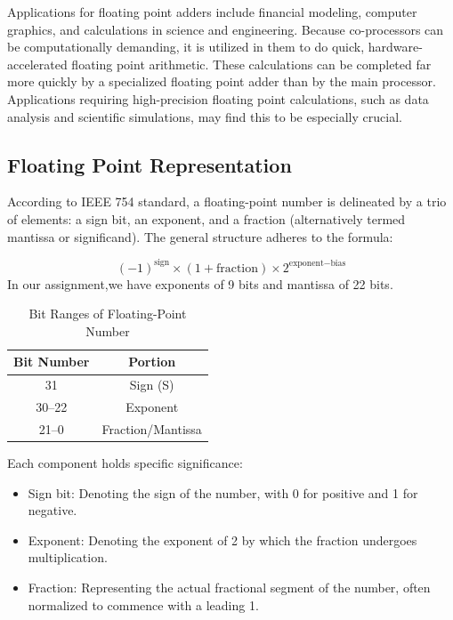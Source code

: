 \documentclass[a4paper,12pt]{article}
\begin{document}
Applications for floating point adders include financial modeling, computer
graphics, and calculations in science and engineering. Because co-processors
can be computationally demanding, it is utilized in them to do quick,
hardware-accelerated floating point arithmetic. These calculations can be
completed far more quickly by a specialized floating point adder than by the
main processor. Applications requiring high-precision floating point
calculations, such as data analysis and scientific simulations, may find this
to be especially crucial.

\subsection{Floating Point Representation}

According to IEEE 754 standard, a floating-point number is delineated by a trio
of elements: a sign bit, an exponent, and a fraction (alternatively termed
mantissa or significand). The general structure adheres to the formula:

\[
    (-1)^{\text{sign}} \times (1 + \text{fraction}) \times 2^{\text{exponent} - \text{bias}}
\]
In our assignment,we have exponents of 9 bits and mantissa of 22 bits.

\begin{table}[h]
    \centering
    \begin{tabular}{|c|c|}
        \hline
        Bit Number & Portion           \\
        \hline
        31         & Sign (S)          \\
        30--22     & Exponent          \\
        21--0      & Fraction/Mantissa \\
        \hline
    \end{tabular}
    \caption{Bit Ranges of Floating-Point Number}
    \label{tab:floating_point_bits}
\end{table}

Each component holds specific significance:

\begin{itemize}
    \item Sign bit: Denoting the sign of the number, with 0 for positive and 1 for
          negative.
    \item Exponent: Denoting the exponent of 2 by which the fraction undergoes
          multiplication.
    \item Fraction: Representing the actual fractional segment of the number, often
          normalized to commence with a leading 1.

\end{itemize}
\end{document}
